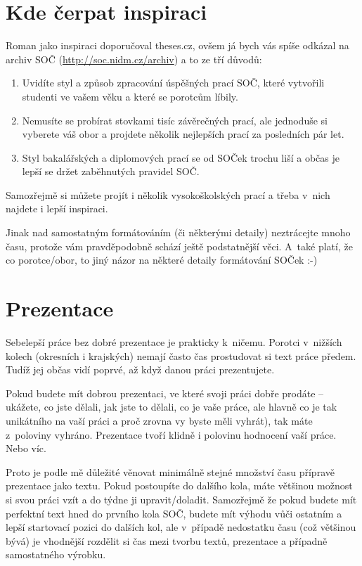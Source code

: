 \documentclass{template/socthesis}
\begin{document}
\section{Kde čerpat inspiraci}
Roman jako inspiraci doporučoval theses.cz, ovšem já bych vás spíše odkázal na archiv SOČ (\url{http://soc.nidm.cz/archiv}) a to ze tří důvodů:

\begin{enumerate}[label=\alph*)]
	\item Uvidíte styl a způsob zpracování úspěšných prací SOČ, které vytvořili studenti ve vašem věku a které se porotcům líbily.
	\item Nemusíte se probírat stovkami tisíc závěrečných prací, ale jednoduše si vyberete váš obor a projdete několik nejlepších prací za posledních pár let.
	\item Styl bakalářských a diplomových prací se od SOČek trochu liší a občas je lepší se držet zaběhnutých pravidel SOČ.
\end{enumerate}
Samozřejmě si můžete projít i několik vysokoškolských prací a třeba v~nich najdete i lepší inspiraci.

Jinak nad samostatným formátováním (či některými detaily) neztrácejte mnoho času, protože vám pravděpodobně schází ještě podstatnější věci.
A~také platí, že co porotce/obor, to jiný názor na některé detaily formátování SOČek :-)

\section{Prezentace}
Sebelepší práce bez dobré prezentace je prakticky k~ničemu.
Porotci v~nižších kolech (okresních i krajských) nemají často čas prostudovat si text práce předem.
Tudíž jej občas vidí poprvé, až když danou práci prezentujete.

Pokud budete mít dobrou prezentaci, ve které svoji práci dobře prodáte – ukážete, co jste dělali, jak jste to dělali, co je vaše práce, ale hlavně co je tak unikátního na vaší práci a proč zrovna vy byste měli vyhrát), tak máte z~poloviny vyhráno.
Prezentace tvoří klidně i polovinu hodnocení vaší práce.
Nebo víc.

Proto je podle mě důležité věnovat minimálně stejné množství času přípravě prezentace jako textu.
Pokud postoupíte do dalšího kola, máte většinou možnost si svou práci vzít a do týdne ji upravit/doladit.
Samozřejmě že pokud budete mít perfektní text hned do prvního kola SOČ, budete mít výhodu vůči ostatním a lepší startovací pozici do dalších kol, ale v~případě nedostatku času (což většinou bývá) je vhodnější rozdělit si čas mezi tvorbu textů, prezentace a případně samostatného výrobku.
\end{document}
